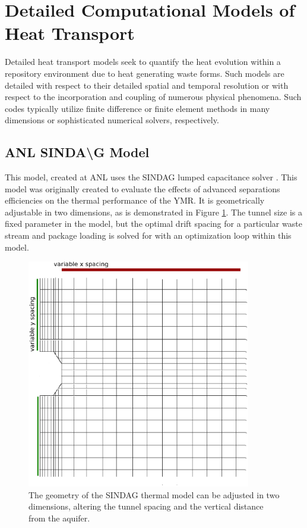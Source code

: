 \section{Detailed Computational Models of Heat Transport}
\label{sec:detailed_heat}


Detailed heat transport models seek to quantify the heat evolution within a 
repository environment due to heat generating waste forms. Such models are 
detailed with respect to their detailed spatial and temporal resolution or 
with respect to the incorporation and coupling of numerous physical phenomena. 
Such codes typically utilize finite difference or finite element methods in 
many dimensions or sophisticated numerical solvers, respectively. 



\subsection{ANL SINDA{\textbackslash}G Model}

This model, created at \gls{ANL} uses the \gls{SINDAG} lumped capacitance
solver \cite{gaski_sinda_1987}. This model was originally  created to evaluate
the effects of advanced separations efficiencies on the thermal performance of
the \gls{YMR}. It is geometrically adjustable in two dimensions,   as is
demonstrated in Figure \ref{fig:sindageom}. The tunnel size is a fixed
parameter in the model, but the optimal drift spacing for a particular waste
stream and package loading is solved for with an optimization loop within this
model.

\begin{figure}[htbp!]
  \begin{center}
    \includegraphics[height=10cm]{./chapters/litrev/sindageom.eps}
  \end{center}
  \caption[A schematic of the \gls{SINDAG} geometry.]{The geometry of the 
    \gls{SINDAG} thermal model can be adjusted in two dimensions, 
  altering the tunnel spacing and the vertical distance from the aquifer.}
  \label{fig:sindageom}
\end{figure}

